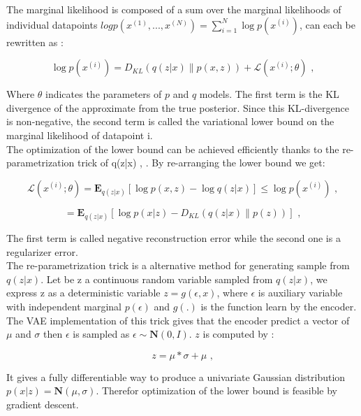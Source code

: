 \documentclass[a4paper]{article}
\begin{document}
The marginal likelihood is composed of a sum over the marginal likelihoods of individual datapoints $log p(x^{(1)},...,x^{(N)})= \sum_{i=1}^N \log{p(x^{(i)})}$, can each be rewritten as :

\begin{equation}
\log{p(x^{(i)})} = D_{KL}(q(z|x)\parallel p(x,z))+\mathcal{L}(x^{(i)};\theta) \mbox{ ,}
\label{equation_log_likelihood}
\end{equation}

Where $\theta$ indicates the parameters of $p$ and $q$ models. The first term is the KL divergence of the approximate from the true posterior.   Since this KL-divergence is non-negative, the second term is called the variational lower bound on the marginal likelihood of datapoint i.\\
The optimization of the lower bound can be achieved efficiently thanks to the re-parametrization trick of q(z|x) \cite{Kingma13}, \cite{Rezende14}. By re-arranging the lower bound we get:

\begin{equation}
\mathcal{L}(x^{(i)};\theta) = \mathbf{E}_{q(z|x)}[\log{p(x,z)}- \log{q(z|x)}] \leq \log{p(x^{(i)})} \mbox{ ,}
\label{equation_lower_bound}
\end{equation}

\begin{equation}
 = \mathbf{E}_{q(z|x)}[\log{p(x|z)}- D_{KL}(q(z|x)\parallel p(z))] \mbox{ ,}
\label{equation_lower_bound2}
\end{equation}

The first term is called negative reconstruction error while the second one is a regularizer error.\\
The re-parametrization trick is a alternative method for generating sample from $q(z|x)$. Let be z a continuous random variable sampled from $q(z|x)$, we express z as a deterministic variable $z=g(\epsilon, x)$, where $\epsilon$ is auxiliary variable with independent marginal $p(\epsilon)$ and $g(.)$ is the function learn by the encoder.\\
The VAE implementation of this trick gives that the encoder predict a vector of $\mu$ and $\sigma$ then $\epsilon$ is sampled as $\epsilon \sim \mathbf{N}(0,I)$. $z$ is computed by :

\begin{equation}
 z = \mu * \sigma + \mu \mbox{ ,}
\label{equation_reparametrization_trick}
\end{equation}

It gives a fully differentiable way to produce a univariate Gaussian distribution $p(x|z)=\mathbf{N}(\mu,\sigma)$. Therefor optimization of the lower bound is feasible by gradient descent.
\end{document}

